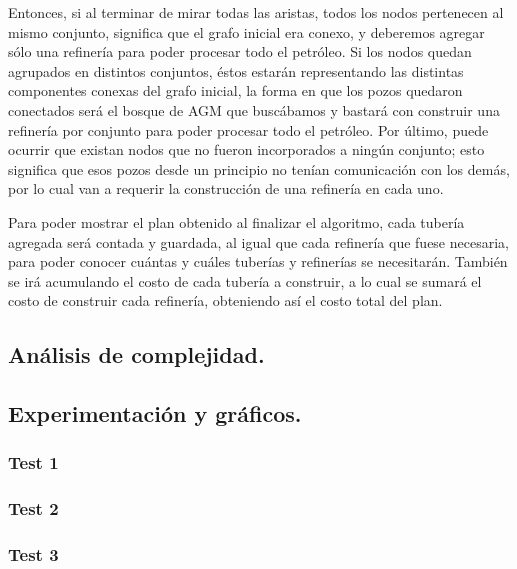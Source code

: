 Entonces, si al terminar de mirar todas las aristas, todos los nodos pertenecen al mismo conjunto, significa que el grafo inicial era conexo, y deberemos agregar sólo una refinería para poder procesar todo el petróleo.  Si los nodos quedan agrupados en distintos conjuntos, éstos estarán representando las distintas componentes conexas del grafo inicial, la forma en que los pozos quedaron conectados será el bosque de AGM que buscábamos y bastará con construir una refinería por conjunto para poder procesar todo el petróleo.  Por último, puede ocurrir que existan nodos que no fueron incorporados a ningún conjunto; esto significa que esos pozos desde un principio no tenían comunicación con los demás, por lo cual van a requerir la construcción de una refinería en cada uno.

Para poder mostrar el plan obtenido al finalizar el algoritmo, cada tubería agregada será contada y guardada, al igual que cada refinería que fuese necesaria, para poder conocer cuántas y cuáles tuberías y refinerías se necesitarán.  También se irá acumulando el costo de cada tubería a construir, a lo cual se sumará el costo de construir cada refinería, obteniendo así el costo total del plan.

\vspace*{0.6cm}

\subsection{Análisis de complejidad.}

\vspace*{0.3cm}


\vspace*{0.6cm}

\subsection{Experimentación y gráficos.}

\vspace*{0.3cm}


\subsubsection{Test 1}

\vspace*{0.3cm}


\vspace*{0.6cm}

\subsubsection{Test 2}

\vspace*{0.3cm}


\vspace*{0.6cm}

\subsubsection{Test 3}

\vspace*{0.3cm}

